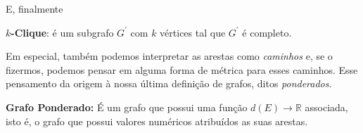 \documentclass[a4paper,12pt]{article}
\begin{document}
E, finalmente
\begin{center}
	\begin{minipage}{0.9 \linewidth}
		\textbf{$k$-Clique}: é um subgrafo $G^\prime$ com $k$ vértices tal que $G^\prime$ é completo.
	\end{minipage}
\end{center}

Em especial, também podemos interpretar as arestas como \textit{caminhos} e, se o fizermos, podemos pensar em alguma forma de métrica para esses caminhos. Esse pensamento da origem à nossa última definição de grafos, ditos \textit{ponderados}.

\begin{center}
	\begin{minipage}{0.9 \linewidth}
		\textbf{Grafo Ponderado:} É um grafo que possui uma função $d(E) \rightarrow \mathbb{R}$ associada, isto é, o grafo que possui valores numéricos atribuídos as suas arestas.
	\end{minipage}
\end{center}

{}



\end{document}
